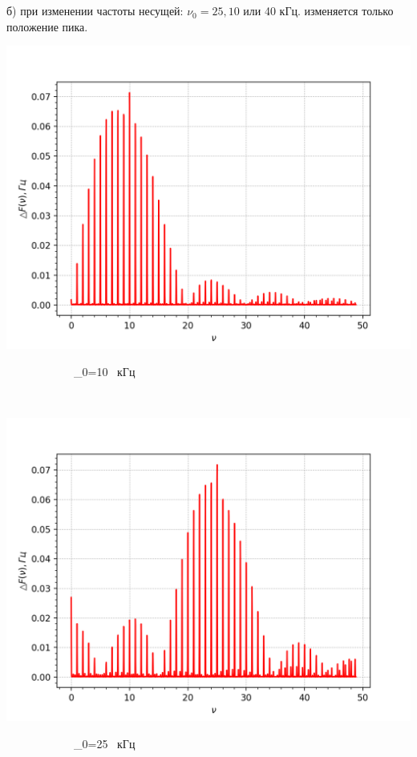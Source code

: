 \\
\
\\
\newpage

б) при изменении частоты несущей: $\nu_{0}=25,10$ или 40 кГц. изменяется только положение пика. \\

\begin{minipage}{0.3\textwidth}
\includegraphics[width=\linewidth]{6.png}\\
\begin{center}
\ \ \ \ \ \ \ \ \ \ \ \ \nu_{0}=10 \ кГц
\end{center}
\end{minipage}
\begin{minipage}{0.05\textwidth}
\begin{center}
\ \ \Rightarrow
\end{center}
\end{minipage}
\begin{minipage}{0.3\textwidth}
\includegraphics[width=\linewidth]{7.png}\\
\begin{center}
\ \ \ \ \ \ \ \ \ \ \ \ \nu_{0}=25 \ кГц
\end{center}
\end{minipage}
